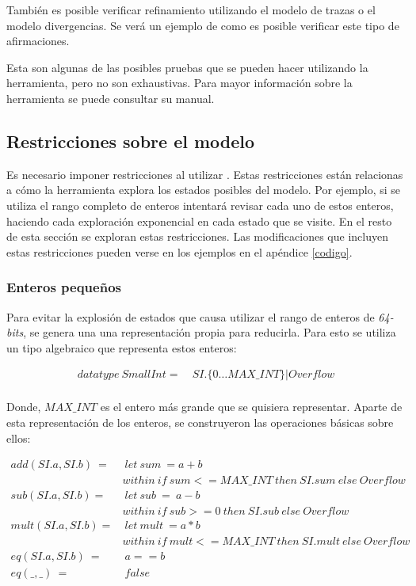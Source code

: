 También es posible verificar refinamiento utilizando el modelo de trazas o el modelo divergencias. Se verá un ejemplo de como es posible verificar este tipo de afirmaciones.

Esta son algunas de las posibles pruebas que se pueden hacer utilizando la herramienta, pero no son exhaustivas. Para mayor información sobre la herramienta se puede consultar su manual\cite{fdrmanual}.

\subsection{Restricciones sobre el modelo}

Es necesario imponer restricciones al utilizar \FDR. Estas restricciones están relacionas a cómo la herramienta explora los estados posibles del modelo. Por ejemplo, si se utiliza el rango completo de enteros intentará revisar cada uno de estos enteros, haciendo cada exploración exponencial en cada estado que se visite. En el resto de esta sección se exploran estas restricciones. Las modificaciones que incluyen estas restricciones pueden verse en los ejemplos en el apéndice \ref{codigo}.

\subsubsection*{Enteros pequeños}

Para evitar la explosión de estados que causa utilizar el rango de enteros de \textit{64-bits}, se genera una una representación propia para reducirla. Para esto se utiliza un tipo algebraico que representa estos enteros:

\begin{align*}
datatype\ SmallInt =&\ SI.\{0 \ldots MAX\_INT\} | Overflow \\
\end{align*}

Donde, $MAX\_INT$ es el entero más grande que se quisiera representar. Aparte de esta representación de los enteros, se construyeron las operaciones básicas sobre ellos:

\begin{align*}
add(SI.a, SI.b)\ =&\ let\ sum\ = a + b \\
&within\ if\ sum <= MAX\_INT\ then\ SI.sum\ else\ Overflow  \\
%
sub(SI.a, SI.b) =&\ let\ sub\ =\ a - b \\
& within\ if\ sub >= 0\ then\ SI.sub\ else\ Overflow \\
%
mult(SI.a, SI.b) =&\ let\ mult\ = a * b \\
& within\ if\ mult <= MAX\_INT\ then\ SI.mult\ else\ Overflow \\
eq(SI.a, SI.b)\ =&\ a == b \\
eq(\_, \_)\ =&\ false
\end{align*}

